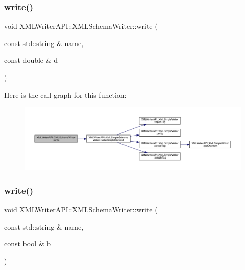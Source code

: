 \subsubsection{\texorpdfstring{write()}{write()}\hspace{0.1cm}{\footnotesize\ttfamily [8/10]}}
{\footnotesize\ttfamily void X\+M\+L\+Writer\+A\+P\+I\+::\+X\+M\+L\+Schema\+Writer\+::write (\begin{DoxyParamCaption}\item[{const std\+::string \&}]{name,  }\item[{const double \&}]{d }\end{DoxyParamCaption})\hspace{0.3cm}{\ttfamily [inline]}}

Here is the call graph for this function\+:
\nopagebreak
\begin{figure}[H]
\begin{center}
\leavevmode
\includegraphics[width=350pt]{db/d34/classXMLWriterAPI_1_1XMLSchemaWriter_aaa0138613c826e77a63e5195bc742f07_cgraph}
\end{center}
\end{figure}
\mbox{\label{classXMLWriterAPI_1_1XMLSchemaWriter_a0d6bf66ccbb217c4db704568f9c377fe}} 
\subsubsection{\texorpdfstring{write()}{write()}\hspace{0.1cm}{\footnotesize\ttfamily [9/10]}}
{\footnotesize\ttfamily void X\+M\+L\+Writer\+A\+P\+I\+::\+X\+M\+L\+Schema\+Writer\+::write (\begin{DoxyParamCaption}\item[{const std\+::string \&}]{name,  }\item[{const bool \&}]{b }\end{DoxyParamCaption})\hspace{0.3cm}{\ttfamily [inline]}}

